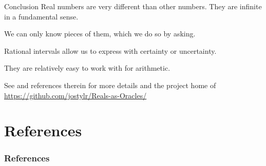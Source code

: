 \documentclass{beamer}
\begin{document}
\begin{frame}{Conclusion}
    Real numbers are very different than other numbers. They are infinite in a fundamental sense. 

    We can only know pieces of them, which we do so by asking. 

    Rational intervals allow us to express with certainty or uncertainty. 

    They are relatively easy to work with for arithmetic. 

    See \cite{taylor23main} and references therein for more details and the project home of \url{https://github.com/jostylr/Reals-as-Oracles/}
    
\end{frame}

\section*{References}
\begin{frame}
    \frametitle{References}
    
    
\end{frame}
\end{document}
